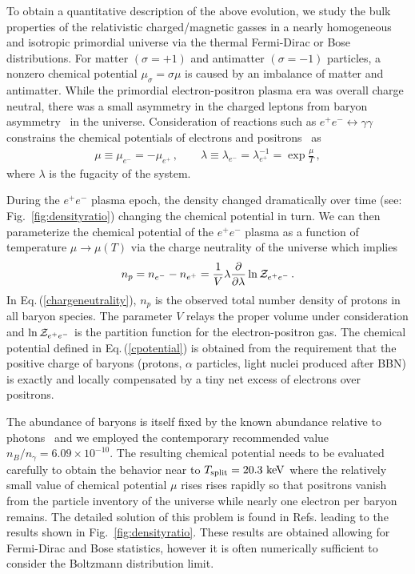 \documentclass[reprint]{revtex4-2}
\newcommand*{\keV}{\text{ keV}}
\newcommand{\req}[1]{Eq.\,(\ref{#1})}
\newcommand{\rf}[1]{Fig.~{\ref{#1}}}
\begin{document}
To obtain a quantitative description of the above evolution, we study the bulk properties of the relativistic charged/magnetic gasses in a nearly homogeneous and isotropic primordial universe via the thermal Fermi-Dirac or Bose distributions. For matter $(\sigma=+1)$ and antimatter $(\sigma=-1)$ particles, a nonzero chemical potential $\mu_{\sigma}=\sigma\mu$ is caused by an imbalance of matter and antimatter. While the primordial electron-positron plasma era was overall charge neutral, there was a small asymmetry in the charged leptons from baryon asymmetry~\cite{fromerth2012quarkgluon,canetti2012matter} in the universe. Consideration of reactions such as $e^+e^-\leftrightarrow\gamma\gamma$ constrains the chemical potentials of electrons and positrons~\cite{elze1980relativistic} as 
\begin{align}
    \label{cpotential}
    \mu\equiv\mu_{e^{-}}=-\mu_{e^{+}}\,,\qquad
    \lambda\equiv\lambda_{e^{-}}=\lambda_{e^{+}}^{-1}=\exp\frac{\mu}{T}\,,
\end{align}
where $\lambda$ is the fugacity of the system. 

During the $e^{+}e^{-}$ plasma epoch, the density changed dramatically over time (see: \rf{fig:densityratio}) changing the chemical potential in turn. We can then parameterize the chemical potential of the $e^{+}e^{-}$ plasma as a function of temperature $\mu\rightarrow\mu(T)$ via the charge neutrality of the universe which implies
\begin{align}
    \label{chargeneutrality}
    n_{p}=n_{e^{-}}-n_{e^{+}}=\frac{1}{V}\lambda\frac{\partial}{\partial\lambda}\ln{\cal Z}_{e^{+}e^{-}}\,.
\end{align}
In \req{chargeneutrality}, $n_{p}$ is the observed total number density of protons in all baryon species. The parameter $V$ relays the proper volume under consideration and $\ln{\cal Z}_{e^{+}e^{-}}$ is the partition function for the electron-positron gas. The chemical potential defined in \req{cpotential} is obtained from the requirement that the positive charge of baryons (protons, $\alpha$ particles, light nuclei produced after BBN) is exactly and locally compensated by a tiny net excess of electrons over positrons.

The abundance of baryons is itself fixed by the known abundance relative to photons~\cite{workman2022pdg} and we employed the contemporary recommended value $n_B/n_\gamma=6.09\times 10^{-10}$. The resulting chemical potential  needs to be evaluated carefully to obtain the behavior near to $T_{\rm split}=20.3\keV$ where the relatively small value of chemical potential $\mu$ rises rises rapidly so that positrons vanish from the particle inventory of the universe while nearly one electron per baryon remains. The detailed solution of this problem is found in Refs.\;\cite{fromerth2012quarkgluon,rafelski2023short} leading to the results shown in \rf{fig:densityratio}. These results are obtained allowing for Fermi-Dirac and Bose statistics, however it is often numerically sufficient to consider the Boltzmann distribution limit.
\end{document}
